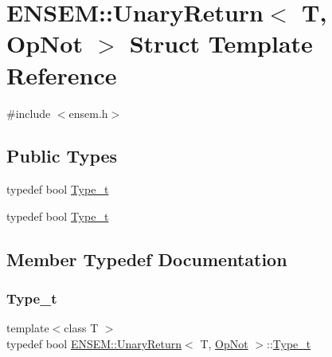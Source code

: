 \hypertarget{structENSEM_1_1UnaryReturn_3_01T_00_01OpNot_01_4}{}\section{E\+N\+S\+EM\+:\+:Unary\+Return$<$ T, Op\+Not $>$ Struct Template Reference}
\label{structENSEM_1_1UnaryReturn_3_01T_00_01OpNot_01_4}


{\ttfamily \#include $<$ensem.\+h$>$}

\subsection*{Public Types}
\begin{DoxyCompactItemize}
\item 
typedef bool \mbox{\hyperlink{structENSEM_1_1UnaryReturn_3_01T_00_01OpNot_01_4_ac8f0fccccf6b1d70cd924f95199cf9b4}{Type\+\_\+t}}
\item 
typedef bool \mbox{\hyperlink{structENSEM_1_1UnaryReturn_3_01T_00_01OpNot_01_4_ac8f0fccccf6b1d70cd924f95199cf9b4}{Type\+\_\+t}}
\end{DoxyCompactItemize}


\subsection{Member Typedef Documentation}
\mbox{\label{structENSEM_1_1UnaryReturn_3_01T_00_01OpNot_01_4_ac8f0fccccf6b1d70cd924f95199cf9b4}} 
\subsubsection{\texorpdfstring{Type\_t}{Type\_t}\hspace{0.1cm}{\footnotesize\ttfamily [1/2]}}
{\footnotesize\ttfamily template$<$class T $>$ \\
typedef bool \mbox{\hyperlink{structENSEM_1_1UnaryReturn}{E\+N\+S\+E\+M\+::\+Unary\+Return}}$<$ T, \mbox{\hyperlink{structENSEM_1_1OpNot}{Op\+Not}} $>$\+::\mbox{\hyperlink{structENSEM_1_1UnaryReturn_3_01T_00_01OpNot_01_4_ac8f0fccccf6b1d70cd924f95199cf9b4}{Type\+\_\+t}}}

\mbox{\label{structENSEM_1_1UnaryReturn_3_01T_00_01OpNot_01_4_ac8f0fccccf6b1d70cd924f95199cf9b4}} 
